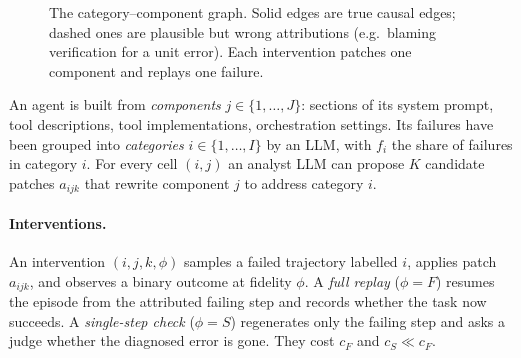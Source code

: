 \documentclass[11pt]{article}
\begin{document}
\begin{figure}[t]
\centering
{}
\caption{The category--component graph. Solid edges are true causal edges; dashed ones are plausible but wrong attributions (e.g.\ blaming verification for a unit error). Each intervention patches one component and replays one failure.}
\label{fig:graph}
\end{figure}

An agent is built from \emph{components} $j\in\{1,\dots,J\}$: sections of its system prompt, tool descriptions, tool implementations, orchestration settings. Its failures have been grouped into \emph{categories} $i\in\{1,\dots,I\}$ by an LLM, with $f_i$ the share of failures in category $i$. For every cell $(i,j)$ an analyst LLM can propose $K$ candidate patches $a_{ijk}$ that rewrite component $j$ to address category $i$.

\paragraph{Interventions.} An intervention $(i,j,k,\phi)$ samples a failed trajectory labelled $i$, applies patch $a_{ijk}$, and observes a binary outcome at fidelity $\phi$. A \emph{full replay} ($\phi=F$) resumes the episode from the attributed failing step and records whether the task now succeeds. A \emph{single-step check} ($\phi=S$) regenerates only the failing step and asks a judge whether the diagnosed error is gone. They cost $c_F$ and $c_S\ll c_F$.
\end{document}
